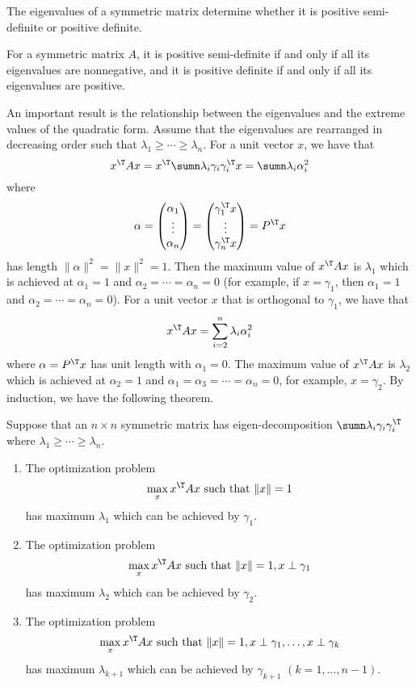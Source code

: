 The eigenvalues of a symmetric matrix determine whether it is positive semi-definite or positive definite. 


\begin{theorem}
For a symmetric matrix $A$, it is positive semi-definite
if and only if all its eigenvalues are nonnegative, and it is positive
definite if and only if all its eigenvalues are positive.
\end{theorem} 





An important result is the relationship between the eigenvalues and the extreme values of the quadratic form. Assume that the eigenvalues are rearranged in decreasing order such that $\lambda_1 \geq \cdots \geq \lambda_n$. 
For a unit vector $x$, we have that
$$
x^{\T} A x = x^{\T} \sumn\lambda_{i}\gamma_{i}\gamma_{i}^{\T} x 
= \sumn\lambda_{i}  \alpha_{i}^2  
$$
where 
$$
\alpha 
= \begin{pmatrix}
\alpha_1 \\
\vdots \\
\alpha_n
\end{pmatrix}
= \begin{pmatrix}
\gamma_1^{\T} x \\
\vdots \\
\gamma_{n}^{\T} x
\end{pmatrix}
= P^{\T} x
$$
has length $ \|\alpha \|^2  = \| x\|^2 = 1$.
Then the maximum value of $x^{\T} A x $ is $\lambda_1$ which is achieved at $\alpha_1 = 1$ and $\alpha_2 = \cdots = \alpha_n = 0$ (for example, if $x = \gamma_1$, then $\alpha_1 = 1$ and $\alpha_2 = \cdots = \alpha_n = 0$). For a unit vector $x$ that is orthogonal to $\gamma_1$, we have that
$$
x^{\T} A x  = \sum_{i=2}^n \lambda_{i}  \alpha_{i}^2 
$$
where $\alpha = P^{\T} x$ has unit length with $\alpha_1 = 0$. The maximum value of $x^{\T} A x $ is $\lambda_2$ which is achieved at $\alpha_2 = 1$ and $\alpha_1 = \alpha_3 = \cdots = \alpha_n = 0$, for example, $x = \gamma_2$. By induction, we have the following theorem.

\begin{theorem}
\label{thm::eigven-max-q}
Suppose that an $n\times n$ symmetric matrix has eigen-decomposition $\sumn\lambda_{i}\gamma_{i}\gamma_{i}^{\T}$ where $\lambda_1 \geq \cdots \geq \lambda_n$. 
\begin{enumerate}
\item
The optimization problem
$$
\max_x x^{\T} A x \text{ such that } \|x\| = 1
$$
has maximum $\lambda_1$ which can be achieved by $\gamma_1$.
\item
The optimization problem
$$
\max_x x^{\T} A x \text{ such that } \|x\| = 1,  x \perp \gamma_1 
$$
has maximum $\lambda_2$ which can be achieved  by $\gamma_2$.
\item
The optimization problem
$$
\max_x x^{\T} A x \text{ such that } \|x\| = 1,  x \perp \gamma_1 ,\ldots, x\perp \gamma_k
$$
has maximum $\lambda_{k+1}$ which can be achieved by $\gamma_{k+1}$ $(k=1, \ldots, n-1)$. 
\end{enumerate}
\end{theorem}


